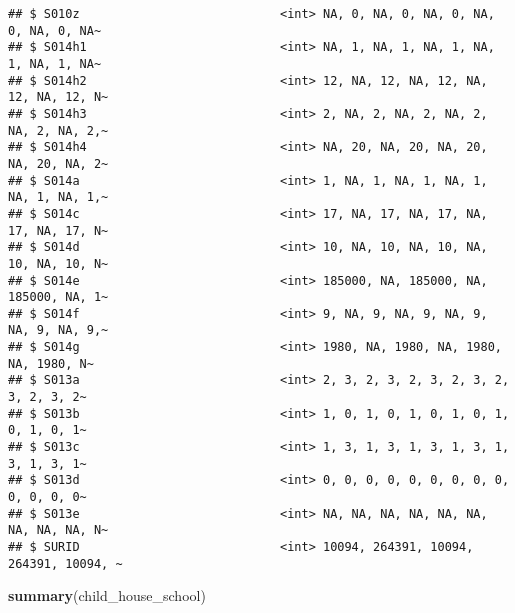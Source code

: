 \documentclass[
]{article}
\newenvironment{Shaded}{\begin{snugshade}}{\end{snugshade}}
\newcommand{\FunctionTok}[1]{\textcolor[rgb]{0.13,0.29,0.53}{\textbf{#1}}}
\newcommand{\NormalTok}[1]{#1}
\begin{document}
\begin{verbatim}
## $ S010z                            <int> NA, 0, NA, 0, NA, 0, NA, 0, NA, 0, NA~
## $ S014h1                           <int> NA, 1, NA, 1, NA, 1, NA, 1, NA, 1, NA~
## $ S014h2                           <int> 12, NA, 12, NA, 12, NA, 12, NA, 12, N~
## $ S014h3                           <int> 2, NA, 2, NA, 2, NA, 2, NA, 2, NA, 2,~
## $ S014h4                           <int> NA, 20, NA, 20, NA, 20, NA, 20, NA, 2~
## $ S014a                            <int> 1, NA, 1, NA, 1, NA, 1, NA, 1, NA, 1,~
## $ S014c                            <int> 17, NA, 17, NA, 17, NA, 17, NA, 17, N~
## $ S014d                            <int> 10, NA, 10, NA, 10, NA, 10, NA, 10, N~
## $ S014e                            <int> 185000, NA, 185000, NA, 185000, NA, 1~
## $ S014f                            <int> 9, NA, 9, NA, 9, NA, 9, NA, 9, NA, 9,~
## $ S014g                            <int> 1980, NA, 1980, NA, 1980, NA, 1980, N~
## $ S013a                            <int> 2, 3, 2, 3, 2, 3, 2, 3, 2, 3, 2, 3, 2~
## $ S013b                            <int> 1, 0, 1, 0, 1, 0, 1, 0, 1, 0, 1, 0, 1~
## $ S013c                            <int> 1, 3, 1, 3, 1, 3, 1, 3, 1, 3, 1, 3, 1~
## $ S013d                            <int> 0, 0, 0, 0, 0, 0, 0, 0, 0, 0, 0, 0, 0~
## $ S013e                            <int> NA, NA, NA, NA, NA, NA, NA, NA, NA, N~
## $ SURID                            <int> 10094, 264391, 10094, 264391, 10094, ~
\end{verbatim}

\begin{Shaded}
\begin{Highlighting}[]
\FunctionTok{summary}\NormalTok{(child\_house\_school)}
\end{Highlighting}
\end{Shaded}
\end{document}
